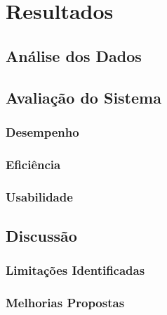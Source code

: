 

\chapter{Resultados}%
\label{cap:resultados}

\section{Análise dos Dados}

\section{Avaliação do Sistema}
\subsection{Desempenho}
\subsection{Eficiência}
\subsection{Usabilidade}

\section{Discussão}
\subsection{Limitações Identificadas}
\subsection{Melhorias Propostas}